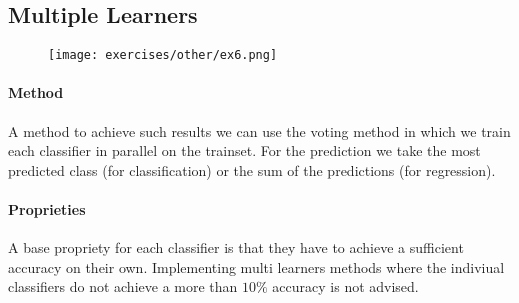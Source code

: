\subsection{Multiple Learners}

\begin{figure}[H]
    \centering
    \texttt{[image: exercises/other/ex6.png]}
\end{figure}

\paragraph{Method}
A method to achieve such results we can use the voting method in which we train each classifier in parallel on the trainset. For the prediction we take the most predicted class (for classification) or the sum of the predictions (for regression).

\paragraph{Proprieties}
A base propriety for each classifier is that they have to achieve a sufficient accuracy on their own. Implementing multi learners methods where the indiviual classifiers do not achieve a more than $10\%$ accuracy is not advised.


